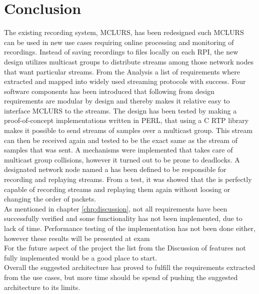 \chapter{Conclusion}
The existing recording system, MCLURS, has been redesigned such MCLURS can be used in new use cases requiring online processing and monitoring of recordings. Instead of saving recordings to files locally on each RPI, the new design utilizes multicast groups to distribute streams among those network nodes that want particular streams. From the Analysis a list of requirements where extracted and mapped into widely used streaming protocols with success. Four software components has been introduced that following from design requirements are modular by design and thereby makes it relative easy to interface MCLURS to the streams. The design has been tested by making a proof-of-concept implementations written in PERL, that using a C RTP library makes it possible to send streams of samples over a multicast group. This stream can then be received again and tested to be the exact same as the stream of samples that was sent. A mechanisms were implemented that takes care of multicast group collisions, however it turned out to be prone to deadlocks. A designated network node named a \hist{} has been defined to be responsible for recording and replaying streams. From a test, it was showed that the \hist{} is perfectly capable of recording streams and replaying them again without loosing or changing the order of packets. \\

\noindent{}As mentioned in chapter \ref{chp:discussion}, not all requirements have been successfully verified and some functionality has not been implemented, due to lack of time. Performance testing of the implementation has not been done either, however these results will be presented at exam\\

\noindent{}For the future aspect of the project the list from the Discussion of features not fully implemented would be a good place to start. \\

\noindent{} Overall the suggested architecture has proved to fulfill the requirements extracted from the use cases, but more time should be spend of pushing the suggested architecture to its limits.
